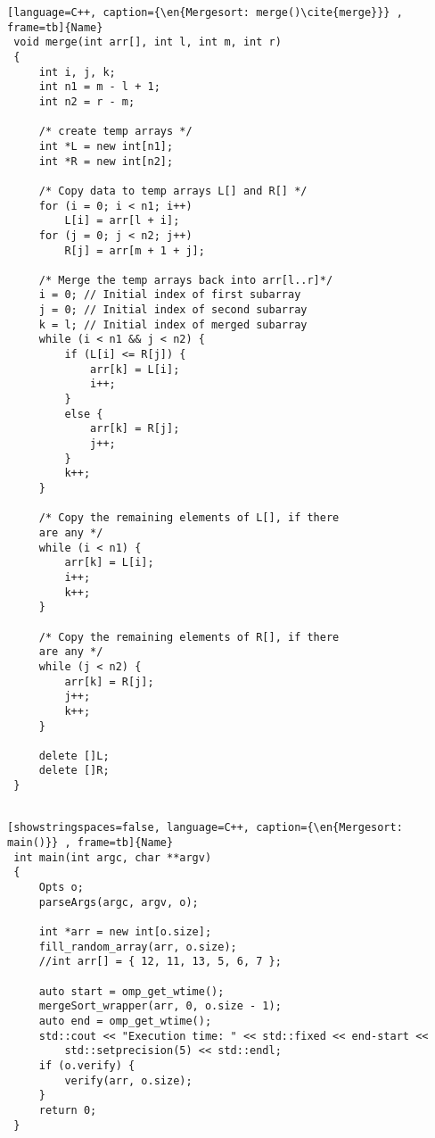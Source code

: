 \clearpage
{}
\begin{spacing}{0.8}
\begin{lstlisting}[language=C++, caption={\en{Mergesort: merge()\cite{merge}}} , frame=tb]{Name}
 void merge(int arr[], int l, int m, int r)
 {
     int i, j, k;
     int n1 = m - l + 1;
     int n2 = r - m;

     /* create temp arrays */
     int *L = new int[n1];
     int *R = new int[n2];

     /* Copy data to temp arrays L[] and R[] */
     for (i = 0; i < n1; i++)
         L[i] = arr[l + i];
     for (j = 0; j < n2; j++)
         R[j] = arr[m + 1 + j];

     /* Merge the temp arrays back into arr[l..r]*/
     i = 0; // Initial index of first subarray
     j = 0; // Initial index of second subarray
     k = l; // Initial index of merged subarray
     while (i < n1 && j < n2) {
         if (L[i] <= R[j]) {
             arr[k] = L[i];
             i++;
         }
         else {
             arr[k] = R[j];
             j++;
         }
         k++;
     }

     /* Copy the remaining elements of L[], if there
     are any */
     while (i < n1) {
         arr[k] = L[i];
         i++;
         k++;
     }

     /* Copy the remaining elements of R[], if there
     are any */
     while (j < n2) {
         arr[k] = R[j];
         j++;
         k++;
     }

     delete []L;
     delete []R;
 }


\end{lstlisting}
\end{spacing}


\clearpage
{}
\begin{spacing}{1.5}
\begin{lstlisting}[showstringspaces=false, language=C++, caption={\en{Mergesort: main()}} , frame=tb]{Name}
 int main(int argc, char **argv)
 {
     Opts o;
     parseArgs(argc, argv, o);

     int *arr = new int[o.size];
     fill_random_array(arr, o.size);
     //int arr[] = { 12, 11, 13, 5, 6, 7 };

     auto start = omp_get_wtime();
     mergeSort_wrapper(arr, 0, o.size - 1);
     auto end = omp_get_wtime();
     std::cout << "Execution time: " << std::fixed << end-start <<
         std::setprecision(5) << std::endl;
     if (o.verify) {
         verify(arr, o.size);
     }
     return 0;
 }

\end{lstlisting}
\end{spacing}



